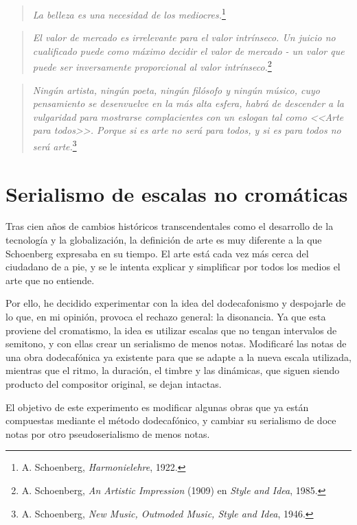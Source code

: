 	\begin{quote}
		\emph{La belleza es una necesidad de los mediocres.}\footnote{A. Schoenberg, \emph{Harmonielehre}, 1922.}
	\end{quote}
	\begin{quote}
		\emph{El valor de mercado es irrelevante para el valor intrínseco. Un juicio no cualificado puede como máximo decidir el valor de mercado - un valor que puede ser inversamente proporcional al valor intrínseco.}\footnote{A. Schoenberg, \emph{An Artistic Impression} (1909) en \emph{Style and Idea}, 1985.}
	\end{quote}
	\begin{quote}
		\emph{Ningún artista, ningún poeta, ningún filósofo y ningún músico, cuyo pensamiento se desenvuelve en la más alta esfera, habrá de descender a la vulgaridad para mostrarse complacientes con un eslogan tal como <<Arte para todos>>. Porque si es arte no será para todos, y si es para todos no será arte.}\footnote{A. Schoenberg, \emph{New Music, Outmoded Music, Style and Idea}, 1946.}
	\end{quote}
	
	\section{Serialismo de escalas no cromáticas}
	Tras cien años de cambios históricos transcendentales como el desarrollo de la tecnología y la globalización, la definición de arte es muy diferente a la que Schoenberg expresaba en su tiempo. El arte está cada vez más cerca del ciudadano de a pie, y se le intenta explicar y simplificar por todos los medios el arte que no entiende.
	
	Por ello, he decidido experimentar con la idea del dodecafonismo y despojarle de lo que, en mi opinión, provoca el rechazo general: la disonancia. Ya que esta proviene del cromatismo, la idea es utilizar escalas que no tengan intervalos de semitono, y con ellas crear un serialismo de menos notas. Modificaré las notas de una obra dodecafónica ya existente para que se adapte a la nueva escala utilizada, mientras que el ritmo, la duración, el timbre y las dinámicas, que siguen siendo producto del compositor original, se dejan intactas.
	
	El objetivo de este experimento es modificar algunas obras que ya están compuestas mediante el método dodecafónico, y cambiar su serialismo de doce notas por otro pseudoserialismo de menos notas. 